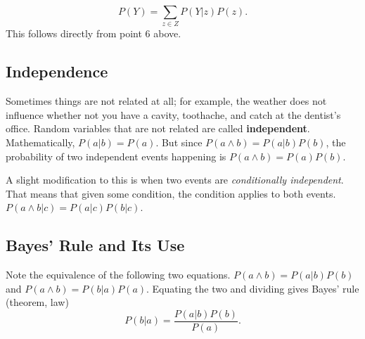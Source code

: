 \documentclass[10pt, twocolumn]{article}
\begin{document}
\[
    P(Y) = \sum_{z \in Z} P(Y \vert z)P(z).
\]
This follows directly from point 6 above.

\subsection*{Independence}
Sometimes things are not related at all; for example, the weather does not
influence whether not you have a cavity, toothache, and catch at the dentist's
office.  Random variables that are not related are called
\textbf{independent}. Mathematically, $P(a \vert b) = P(a)$.  But since $P (a
\land b) = P(a \vert b) P(b)$, the probability of two independent events
happening is $P(a\land b) = P(a)P(b)$.

A slight modification to this is when two events are \textit{conditionally independent}.  That means that given some condition, the condition applies to both events. $P(a \land b \vert c) = P(a \vert c) P(b \vert c)$.

\subsection*{Bayes' Rule and Its Use}
Note the equivalence of the following two equations.  $P(a \land b) = P(a \vert b) P(b)$ and $P(a \land b) = P(b \vert a) P(a)$.  Equating the two and dividing gives Bayes' rule (theorem, law)
\[
    P(b \vert a) = \frac{P(a\vert b) P(b)}{P(a)}.
\]
\end{document}
